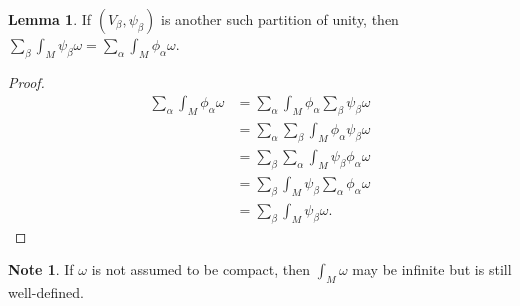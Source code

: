 \documentclass[10pt,letterpaper,cm]{nupset}
\theoremstyle{definition}
\newtheorem{note}[definition]{Note}
\theoremstyle{theorem}
\newtheorem{lemma}[definition]{Lemma}
\theoremstyle{remark}
\newcommand{\1}{\mathbf{1}}
\newcommand{\0}{\vec 0}
\begin{document}
\begin{lemma}
If $\left(V_{\beta}, \psi_{\beta}\right)$ is another such partition of unity, then $\sum_{\beta}\int_M\psi_{\beta} \omega = \sum_{\alpha}  \int_M \phi_{\alpha} \omega$.
\end{lemma}
\begin{proof}
\begin{align*}
 \sum_{\alpha}  \int_M \phi_{\alpha} \omega
& =  \sum_{\alpha}  \int_M \phi_{\alpha} \sum_{\beta} \psi_{\beta} \omega
\\ & = \sum_{\alpha} \sum_{\beta} \int_M \phi_{\alpha} \psi_{\beta} \omega
\\ & = \sum_{\beta} \sum_{\alpha} \int_M \psi_{\beta} \phi_{\alpha} \omega
\\ & = \sum_{\beta}  \int_M \psi_{\beta} \sum_{\alpha} \phi_{\alpha} \omega
\\ & = \sum_{\beta}\int_M\psi_{\beta} \omega. 
\end{align*}
\end{proof}

\begin{note}
If $\omega$ is not assumed to be compact, then $\int_M \omega$ may be infinite but is still well-defined.
\end{note}
\end{document}
